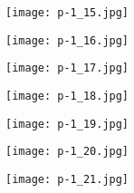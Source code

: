 \clearpage


\begin{figure}
    \begin{center}
        \texttt{[image: p-1\_15.jpg]}
        \caption{}
    \end{center}
\end{figure}

\clearpage


\begin{figure}
    \begin{center}
        \texttt{[image: p-1\_16.jpg]}
        \caption{}
    \end{center}
\end{figure}

\clearpage


\begin{figure}
    \begin{center}
        \texttt{[image: p-1\_17.jpg]}
        \caption{}
    \end{center}
\end{figure}

\clearpage


\begin{figure}
    \begin{center}
        \texttt{[image: p-1\_18.jpg]}
        \caption{}
    \end{center}
\end{figure}

\clearpage


\begin{figure}
    \begin{center}
        \texttt{[image: p-1\_19.jpg]}
        \caption{}
    \end{center}
\end{figure}

\clearpage


\begin{figure}
    \begin{center}
        \texttt{[image: p-1\_20.jpg]}
        \caption{}
    \end{center}
\end{figure}

\clearpage


\begin{figure}
    \begin{center}
        \texttt{[image: p-1\_21.jpg]}
        \caption{}
    \end{center}
\end{figure}


